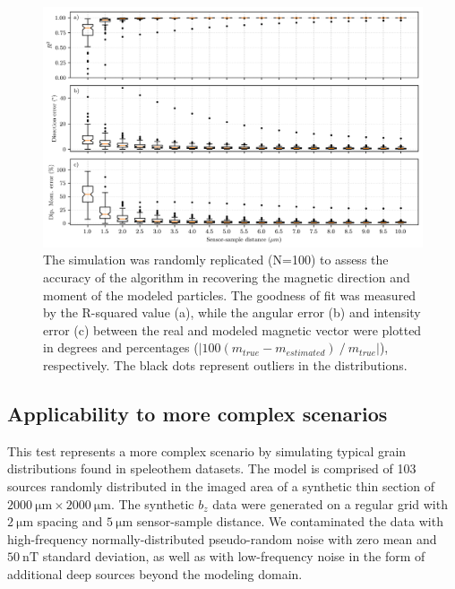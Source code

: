 \begin{figure}[tb!]
  \centering
  \includegraphics[width=1\linewidth]{figures/non-dipolarity-synthetic-inversion.png}
  \caption{The simulation was randomly replicated (N=100) to assess the accuracy of the algorithm in recovering the magnetic direction and moment of the modeled particles. The goodness of fit was measured by the R-squared value (a), while the angular error (b) and intensity error (c) between the real and modeled magnetic vector were plotted in degrees and percentages ($|100 \left( m_{true} - m_{estimated}\right) ~/~ m_{true}|$), respectively. The black dots represent outliers in the distributions.
}
  \label{non-dipolarity-synthetic-data-inversion}
\end{figure}

\subsection{Applicability to more complex scenarios}

This test represents a more complex scenario by simulating typical grain distributions found in speleothem datasets.
The model is comprised of 103 sources randomly distributed in the imaged area of a synthetic thin section of $\qty{2000}{\um} \times \qty{2000}{\um}$.
The synthetic $b_z$ data were generated on a regular grid with $\qty{2}{\um}$ spacing and $\qty{5}{\um}$ sensor-sample distance.
We contaminated the data with high-frequency normally-distributed pseudo-random noise with zero mean and $\qty{50}{\nano\tesla}$ standard deviation, as well as with low-frequency noise in the form of additional deep sources beyond the modeling domain.

